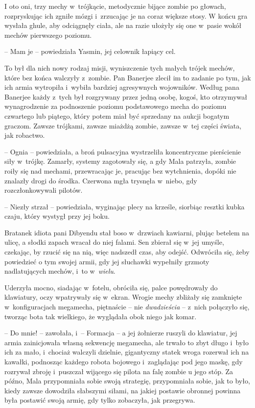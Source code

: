 \documentclass[oneside,polish,11pt,rmheadings]{mwbk}
\begin{document}
I oto oni, trzy mechy w~trójkącie, metodycznie bijące zombie po głowach, rozpryskując ich zgniłe mózgi i~zrzucając je na coraz większe stosy. W końcu gra wysłała ghule, aby odciągnęły ciała, ale na razie ułożyły się one w~pasie wokół mechów pierwszego poziomu. 


-- Mam je -- powiedziała Yasmin, jej celownik łapiący cel. 

To był dla nich nowy rodzaj misji, wyniszczenie tych małych trójek mechów, które bez końca walczyły z~zombie. Pan Banerjee zlecił im to zadanie po tym, jak ich armia wytropiła i~wybiła bardziej agresywnych wojowników. Według pana Banerjee każdy z~tych był rozgrywany przez jedną osobę, kogoś, kto otrzymywał wynagrodzenie za podnoszenie poziomu podstawowego mecha do poziomu czwartego lub piątego, który potem miał być sprzedany na aukcji bogatym graczom. Zawsze trójkami, zawsze miażdżą zombie, zawsze w~tej części świata, jak robactwo. 


-- Ognia -- powiedziała, a broń pulsacyjna wystrzeliła koncentryczne pierścienie siły w~trójkę. Zamarły, systemy zagotowały się, a gdy Mala patrzyła, zombie roiły się nad mechami, przewracając je, pracując bez wytchnienia, dopóki nie znalazły drogi do środka. Czerwona mgła trysnęła w~niebo, gdy rozczłonkowywali pilotów. 


-- Niezły strzał -- powiedziała, wyginając plecy na krześle, siorbiąc resztki kubka czaju, który wystygł przy jej boku. 

Bratanek idiota pani Dibyendu stał boso w~drzwiach kawiarni, plując betelem na ulicę, a słodki zapach wracał do niej falami. Sen zbierał się w~jej umyśle, czekając, by rzucić się na nią, więc nadszedł czas, aby odejść. Odwróciła się, żeby powiedzieć o tym swojej armii, gdy jej słuchawki wypełniły grzmoty nadlatujących mechów, i~to w~\textit{wielu}. 


Uderzyła mocno, siadając w~fotelu, obróciła się, palce powędrowały do klawiatury, oczy wpatrywały się w~ekran. Wrogie mechy zbliżały się zamknięte w~konfiguracjach megamecha, piętnaście -- nie \textit{dwadzieścia }-- z~nich połączyło się, tworząc bota tak wielkiego, że wyglądała obok niego jak komar.  


-- Do mnie! -- zawołała, i~-- Formacja -- a jej żołnierze ruszyli do klawiatur, jej armia zainicjowała własną sekwencję megamecha, ale trwało to zbyt długo i~było ich za mało, i~chociaż walczyli dzielnie, gigantyczny statek wroga rozerwał ich na kawałki, podnosząc każdego robota bojowego i~zaglądając pod jego maskę, gdy rozrywał zbroję i~puszczał wijącego się pilota na falę zombie u jego stóp. Za późno, Mala przypomniała sobie swoją strategię, przypomniała sobie, jak to było, kiedy zawsze dowodziła słabszymi siłami, na jakiej postawie obronnej powinna była postawić swoją armię, gdy tylko zobaczyła, jak przegrywa. 
\end{document}
